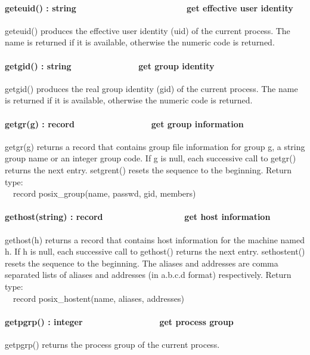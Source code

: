 \paragraph[geteuid() : string\ \ \ \ \ \ \ \ \ \ 
\ \ \ \ \ \ \ \ \ \ \ \ \ get effective user identity]{geteuid() :
string\ \ \ \ \ \ \ \ \ \  \ \ \ \ \ \ \ \ \ \ \ \ \ get effective user
identity}
geteuid() produces the effective user identity (uid) of the current
process. The name is returned if it is available, otherwise the numeric
code is returned.

\paragraph[getgid() : string\ \ \ \ \ \ \ \ \ \ \ \ \ \  get group
identity]{getgid() : string\ \ \ \ \ \ \ \ \ \ \ \ \ \  get group
identity}
getgid() produces the real group identity (gid) of the current process.
The name is returned if it is available, otherwise the numeric code is
returned.

\paragraph[getgr(g) : record\ \ \ \ \ \ \ \ \ \ \ \  \ \ \ \ get group
information]{getgr(g) : record\ \ \ \ \ \ \ \ \ \ \ \  \ \ \ \ get
group information}
getgr(g) returns a record that contains group file information for group
g, a string group name or an integer group code. If g is null, each
successive call to getgr() returns the next entry. setgrent() resets
the sequence to the beginning. Return type:\\
\ \ record posix\_group(name, passwd, gid, members)

\paragraph[gethost(string) : record\ \ \ \ \ \ \ \ \ \ 
\ \ \ \ \ \ \ get host information]{gethost(string) :
record\ \ \ \ \ \ \ \ \ \  \ \ \ \ \ \ \ get host information}
gethost(h) returns a record that contains host information for the
machine named h. If h is null, each successive call to gethost()
returns the next entry. sethostent() resets the sequence to the
beginning. The aliases and addresses are comma separated lists of
aliases and addresses (in a.b.c.d format) respectively. Return
type:\\
\ \ record posix\_hostent(name, aliases, addresses)

\paragraph[getpgrp() : integer\ \ \ \ \ \ \ \ \ \ \ \ \ \  \ \ get
process group]{getpgrp() : integer\ \ \ \ \ \ \ \ \ \ \ \ \ \  \ \ get
process group}
getpgrp() returns the process group of the current process. 

